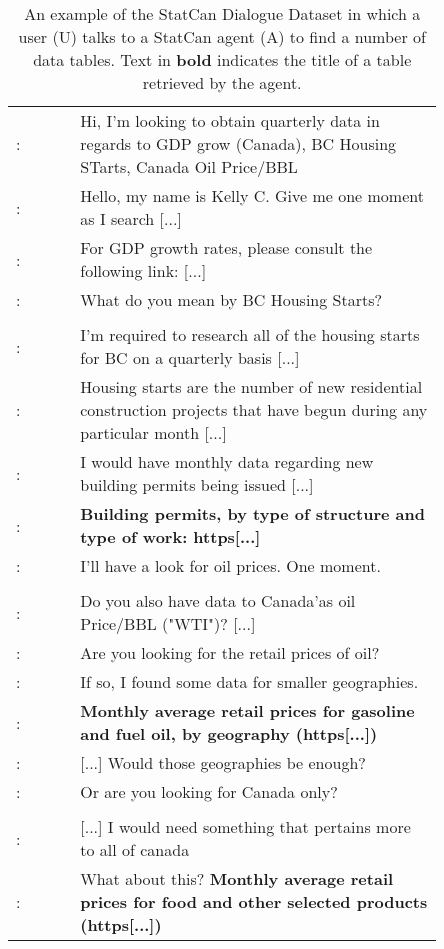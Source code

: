 \documentclass[11pt]{article}
\begin{document}
\begin{table}[h!]
    \small
    \centering
    \begin{tabular}{l p{0.85\linewidth}}
    \toprule
    :  & Hi, I'm looking to obtain quarterly data in regards to GDP grow (Canada), BC Housing STarts, Canada Oil Price/BBL\\
    : & Hello, my name is Kelly C. Give me one moment as I search [...]\\ 
    : & For GDP growth rates, please consult the following link: [...]\\
    : & What do you mean by BC Housing Starts?\\
    \\
    : & I'm required to research all of the housing starts for BC on a quarterly basis [...]\\
    : & Housing starts are the number of new residential construction projects that have begun during any particular month [...]\\
    : & I would have monthly data regarding new building permits being issued [...] \\ 
    : & \textbf{Building permits, by type of structure and type of work: https[...]}\\
    : & I'll have a look for oil prices. One moment.\\
    \\
    : & Do you also have data to Canada'as oil Price/BBL ("WTI")? [...]\\
    : & Are you looking for the retail prices of oil?\\
    : & If so, I found some data for smaller geographies.\\
    : & \textbf{Monthly average retail prices for gasoline and fuel oil, by geography (https[...])}\\
    : & [...] Would those geographies be enough?\\
    : & Or are you looking for Canada only?\\
    \\
    : & [...] I would need something that pertains more to all of canada\\
    : & What about this? \textbf{Monthly average retail prices for food and other selected products (https[...])}\\
    \bottomrule
    \end{tabular}
    \caption{An example of the StatCan Dialogue Dataset in which a user (U) talks to a StatCan agent (A) to find a number of data tables.  Text in \textbf{bold} indicates the title of a table retrieved by the agent.
    }
    \label{tab:selected_example_conversation}
    \vspace{-3mm}
\end{table}
\end{document}
